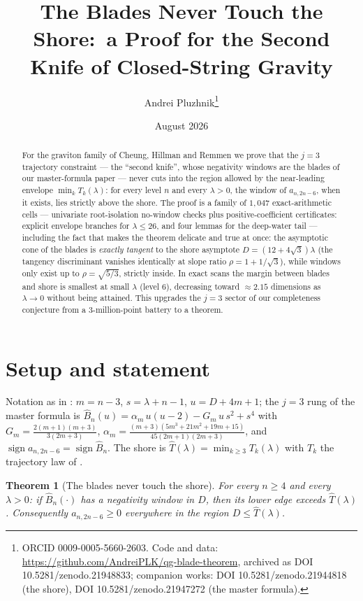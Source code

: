 \documentclass[11pt]{article}
\title{The Blades Never Touch the Shore:\ a Proof for the Second Knife of Closed-String Gravity}
\author{Andrei Pluzhnik\thanks{ORCID 0009-0005-5660-2603. Code and data:
\url{https://github.com/AndreiPLK/qg-blade-theorem}, archived as DOI
10.5281/zenodo.21948833; companion works: DOI 10.5281/zenodo.21944818
(the shore), DOI 10.5281/zenodo.21947272 (the master formula).}}
\date{August 2026}
\newtheorem{theorem}{Theorem}
\begin{document}
\maketitle

\begin{abstract}
For the graviton family of Cheung, Hillman and Remmen we prove that the
$j{=}3$ trajectory constraint --- the ``second knife'', whose negativity
windows are the blades of our master-formula paper --- never cuts into the
region allowed by the near-leading envelope $\min_k T_k(\lambda)$: for every
level $n$ and every $\lambda>0$, the window of $a_{n,2n-6}$, when it exists,
lies strictly above the shore. The proof is a family of $1{,}047$
exact-arithmetic cells --- univariate root-isolation no-window checks plus
positive-coefficient certificates: explicit envelope
branches for $\lambda\le26$, and four lemmas for the deep-water tail ---
including the fact that makes the theorem delicate and true at once: the
asymptotic cone of the blades is \emph{exactly tangent} to the shore
asymptote $D=(12+4\sqrt3)\lambda$ (the tangency discriminant vanishes
identically at slope ratio $\rho=1+1/\sqrt3$), while windows only exist up to
$\rho=\sqrt{5/3}$, strictly inside. In exact scans the margin between blades
and shore is smallest at small $\lambda$ (level $6$), decreasing toward
$\approx2.15$ dimensions as $\lambda\to0$ without being attained. This
upgrades the
$j{=}3$ sector of our completeness conjecture from a $3$-million-point
battery to a theorem.
\end{abstract}

\section{Setup and statement}
Notation as in \cite{master}: $m=n-3$, $s=\lambda+n-1$, $u=D+4m+1$; the
$j{=}3$ rung of the master formula is
$\widehat B_n(u)=\alpha_m\,u(u-2)-G_m\,u\,s^2+s^4$ with
$G_m=\tfrac{2(m+1)(m+3)}{3(2m+3)}$,
$\alpha_m=\tfrac{(m+3)(5m^3+21m^2+19m+15)}{45(2m+1)(2m+3)}$, and
$\operatorname{sign}a_{n,2n-6}=\operatorname{sign}\widehat B_n$. The shore is
$\widehat T(\lambda)=\min_{k\ge3}T_k(\lambda)$ with $T_k$ the trajectory law
of \cite{shore}.

\begin{theorem}[The blades never touch the shore]\label{thm:blades}
For every $n\ge4$ and every $\lambda>0$: if $\widehat B_n(\cdot)$ has a
negativity window in $D$, then its lower edge exceeds
$\widehat T(\lambda)$. Consequently $a_{n,2n-6}\ge0$ everywhere in the
region $D\le\widehat T(\lambda)$.
\end{theorem}
\end{document}
